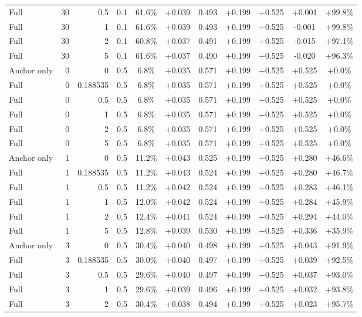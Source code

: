 \begin{table}[htbp]
\begin{tabular}{lrrrccccccc}
Full & 30 & 0.5 & 0.1 & 61.6\% & +0.039 & 0.493 & +0.199 & +0.525 & +0.001 & +99.8\% \\
Full & 30 & 1 & 0.1 & 61.6\% & +0.039 & 0.493 & +0.199 & +0.525 & -0.001 & +99.8\% \\
Full & 30 & 2 & 0.1 & 60.8\% & +0.037 & 0.491 & +0.199 & +0.525 & -0.015 & +97.1\% \\
Full & 30 & 5 & 0.1 & 61.6\% & +0.037 & 0.490 & +0.199 & +0.525 & -0.020 & +96.3\% \\
Anchor only & 0 & 0 & 0.5 & 6.8\% & +0.035 & 0.571 & +0.199 & +0.525 & +0.525 & +0.0\% \\
Full & 0 & 0.188535 & 0.5 & 6.8\% & +0.035 & 0.571 & +0.199 & +0.525 & +0.525 & +0.0\% \\
Full & 0 & 0.5 & 0.5 & 6.8\% & +0.035 & 0.571 & +0.199 & +0.525 & +0.525 & +0.0\% \\
Full & 0 & 1 & 0.5 & 6.8\% & +0.035 & 0.571 & +0.199 & +0.525 & +0.525 & +0.0\% \\
Full & 0 & 2 & 0.5 & 6.8\% & +0.035 & 0.571 & +0.199 & +0.525 & +0.525 & +0.0\% \\
Full & 0 & 5 & 0.5 & 6.8\% & +0.035 & 0.571 & +0.199 & +0.525 & +0.525 & +0.0\% \\
Anchor only & 1 & 0 & 0.5 & 11.2\% & +0.043 & 0.525 & +0.199 & +0.525 & +0.280 & +46.6\% \\
Full & 1 & 0.188535 & 0.5 & 11.2\% & +0.043 & 0.524 & +0.199 & +0.525 & +0.280 & +46.7\% \\
Full & 1 & 0.5 & 0.5 & 11.2\% & +0.042 & 0.524 & +0.199 & +0.525 & +0.283 & +46.1\% \\
Full & 1 & 1 & 0.5 & 12.0\% & +0.042 & 0.524 & +0.199 & +0.525 & +0.284 & +45.9\% \\
Full & 1 & 2 & 0.5 & 12.4\% & +0.041 & 0.524 & +0.199 & +0.525 & +0.294 & +44.0\% \\
Full & 1 & 5 & 0.5 & 12.8\% & +0.039 & 0.530 & +0.199 & +0.525 & +0.336 & +35.9\% \\
Anchor only & 3 & 0 & 0.5 & 30.4\% & +0.040 & 0.498 & +0.199 & +0.525 & +0.043 & +91.9\% \\
Full & 3 & 0.188535 & 0.5 & 30.0\% & +0.040 & 0.497 & +0.199 & +0.525 & +0.039 & +92.5\% \\
Full & 3 & 0.5 & 0.5 & 29.6\% & +0.040 & 0.497 & +0.199 & +0.525 & +0.037 & +93.0\% \\
Full & 3 & 1 & 0.5 & 29.6\% & +0.039 & 0.496 & +0.199 & +0.525 & +0.032 & +93.8\% \\
Full & 3 & 2 & 0.5 & 30.4\% & +0.038 & 0.494 & +0.199 & +0.525 & +0.023 & +95.7\% \\

\end{tabular}
\end{table}

